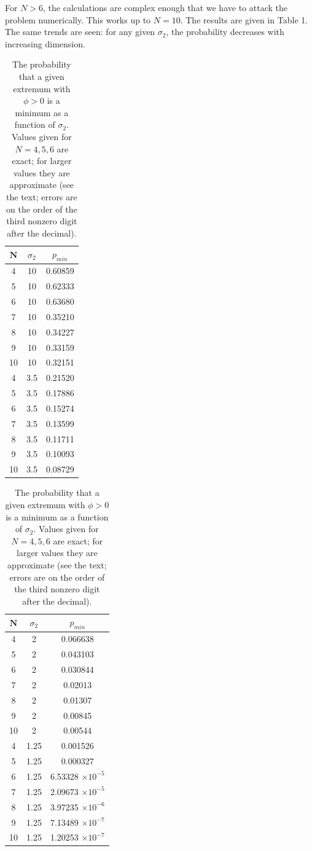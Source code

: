 \documentclass[12pt]{article}
\begin{document}
For $N > 6$, the calculations are complex enough that we have to attack the problem numerically. This works up to $N=10$. The results are given in Table 1. The same trends are seen: for any given $\sigma_2$, the probability decreases with increasing dimension.

\begin{table}[h!]
  \begin{center}
    \caption{The probability that a given extremum with $\phi > 0$ is a minimum as a function of $\sigma_2$. Values given for $N=4,5,6$ are exact; for larger values they are approximate (see the text; errors are on the order of the third nonzero digit after the decimal).}
    \label{tab:table1}
    \begin{tabular}{c|c|c} %
      $\textbf{N}$ & $\sigma_2$ & $p_{min}$\\
      \hline
      4 & 10 & 0.60859\\
      5 & 10 & 0.62333\\
      6 & 10 & 0.63680\\
      7 & 10 & 0.35210\\
      8 & 10 & 0.34227\\
      9 & 10 & 0.33159\\
      10 & 10 & 0.32151\\
      \hline
      4 & 3.5 & 0.21520\\
      5 & 3.5 & 0.17886\\
      6 & 3.5 & 0.15274\\
      7 & 3.5 & 0.13599\\
      8 & 3.5 & 0.11711\\
      9 & 3.5 & 0.10093\\
      10 & 3.5 & 0.08729\\
      \end{tabular}
      \quad
      \begin{tabular}{c|c|c} 
      $\textbf{N}$ & $\sigma_2$ & $p_{min}$\\
      \hline
      4 & 2 & 0.066638\\
      5 & 2 & 0.043103\\
      6 & 2 & 0.030844\\
      7 & 2 & 0.02013\\
      8 & 2 & 0.01307\\
      9 & 2 & 0.00845\\
      10 & 2 & 0.00544\\
      \hline
      4 & 1.25 & 0.001526\\
      5 & 1.25 & 0.000327\\
      6 & 1.25 & 6.53328 $\times 10^{-5}$\\
      7 & 1.25 & 2.09673 $\times 10^{-5}$ \\
      8 & 1.25 & 3.97235  $\times 10^{-6}$ \\
      9 & 1.25 & 7.13489  $\times 10^{-7}$ \\
      10 & 1.25 & 1.20253  $\times 10^{-7}$ \\
     \end{tabular}
  \end{center}
\end{table}
\end{document}
